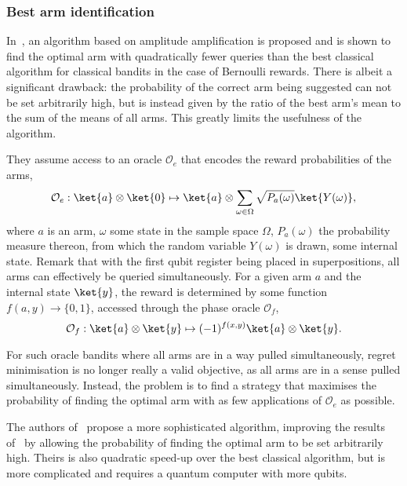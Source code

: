 \subsubsection{Best arm identification}
In~\autocite{casale2020}, an algorithm based on amplitude amplification is proposed and is shown to find the optimal arm with quadratically fewer queries than the best classical algorithm for classical bandits in the case of Bernoulli rewards.
There is albeit a significant drawback: the probability of the correct arm being suggested can not be set arbitrarily high, but is instead given by the ratio of the best arm's mean to the sum of the means of all arms.
This greatly limits the usefulness of the algorithm.

They assume access to an oracle $\mathcal{O}_e$ that encodes the reward probabilities of the arms,
\begin{equation}
    \mathcal{O}_e: \ket{a} \otimes \ket{0} \mapsto \ket{a} \otimes \sum_{\omega \in \Omega} \sqrt{P_a(\omega)} \ket{Y(\omega)},
\end{equation}
where $a$ is an arm, $\omega$ some state in the sample space $\Omega$, $P_a(\omega)$ the probability measure thereon, from which the random variable $Y(\omega)$ is drawn, some internal state.
Remark that with the first qubit register being placed in superpositions, all arms can effectively be queried simultaneously.
For a given arm $a$ and the internal state $\ket{y}$, the reward is determined by some function $f(a, y) \to \{0, 1\}$, accessed through the phase oracle $\mathcal{O}_f$,
\begin{equation}
    \mathcal{O}_f :  \ket{a}\otimes\ket{y} \mapsto (-1)^{f(x,y)} \ket{a}\otimes\ket{y}.
\end{equation}

For such oracle bandits where all arms are in a way pulled simultaneously, regret minimisation is no longer really a valid objective, as all arms are in a sense pulled simultaneously.
Instead, the problem is to find a strategy that maximises the probability of finding the optimal arm with as few applications of $\mathcal{O}_e$ as possible.

The authors of~\autocite{wang2021} propose a more sophisticated algorithm, improving the results of~\autocite{casale2020} by allowing the probability of finding the optimal arm to be set arbitrarily high.
Theirs is also quadratic speed-up over the best classical algorithm, but is more complicated and requires a quantum computer with more qubits.
